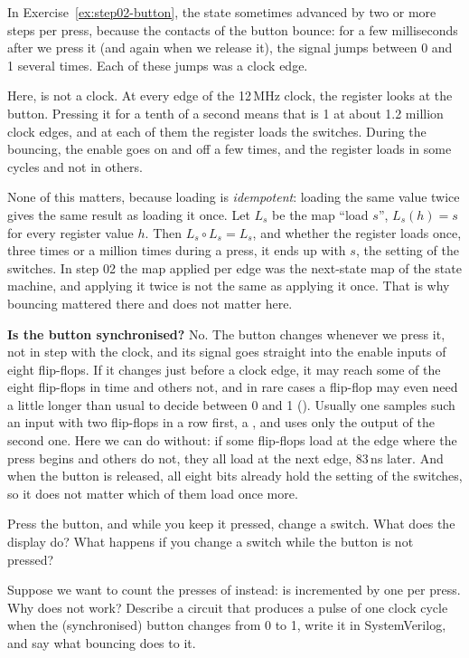 In Exercise~\ref{ex:step02-button}, the state sometimes advanced by two or more
steps per press, because the contacts of the button bounce: for a few
milliseconds after we press it (and again when we release it), the signal
jumps between 0 and 1 several times. Each of these jumps was a clock edge.

Here,  is not a clock. At every edge of the 12\,MHz clock, the
register looks at the button. Pressing it for a tenth of a second means that
 is 1 at about 1.2 million clock edges, and at each of them the
register loads the switches. During the bouncing, the enable goes on and off a
few times, and the register loads in some cycles and not in others.

None of this matters, because loading is \emph{idempotent}: loading the same
value twice gives the same result as loading it once. Let $L_s$ be the map
``load $s$'', $L_s(h) = s$ for every register value $h$. Then $L_s \circ L_s =
L_s$, and whether the register loads once, three times or a million times
during a press, it ends up with $s$, the setting of the switches. In step 02
the map applied per edge was the next-state map of the state machine, and
applying it twice is not the same as applying it once. That is why bouncing
mattered there and does not matter here.

\textbf{Is the button synchronised?} No. The button changes whenever we press
it, not in step with the clock, and its signal goes straight into the enable
inputs of eight flip-flops. If it changes just before a clock edge, it may
reach some of the eight flip-flops in time and others not, and in rare cases a
flip-flop may even need a little longer than usual to decide between 0 and 1
(). Usually one samples such an input with two flip-flops
in a row first, a , and uses only the output of the second
one. Here we can do without: if some flip-flops load at the edge where the
press begins and others do not, they all load at the next edge, 83\,ns later.
And when the button is released, all eight bits already hold the setting of
the switches, so it does not matter which of them load once more.

\begin{exercise}
\label{ex:step04-change}
Press the button, and while you keep it pressed, change a switch. What does
the display do? What happens if you change a switch while the button is not
pressed?
\end{exercise}

\begin{exercise}
\label{ex:step04-count}
Suppose we want to count the presses of  instead:  is
incremented by one per press. Why does 
not work? Describe a circuit that produces a pulse of one clock cycle when
the (synchronised) button changes from 0 to 1, write it in SystemVerilog, and
say what bouncing does to it.
\end{exercise}

